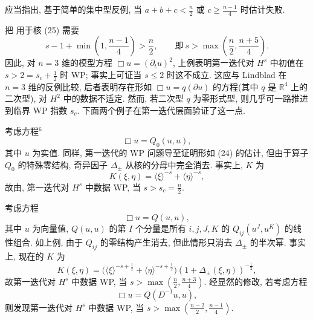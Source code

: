 \begin{remark}\label{rem:2.7}
应当指出, 基于简单的集中型反例, 当 $a + b + c < \frac{n}{2}$ 或 $c \geq \frac{n-1}{4}$ 时估计失败.\end{remark}

把 用于核 (25) 需要
\[
s-1+\min\left(1,\frac{n-1}{4}\right)>\frac{n}{2},\qquad \text{即}\ s>\max\left(\frac{n}{2},\frac{n+5}{4}\right).
\]
因此, 对 $n = 3$ 维的模型方程 $\Box u = (\partial_t u)^2$, 上例表明第一迭代对 $H^s$ 中初值在 $s > 2 = s_c + \frac{1}{2}$ 时 WP; 事实上可证当 $s \leq 2$ 时这不成立. 这应与 Lindblad \cite{klai49} 在 $n = 3$ 维的反例比较, 后者表明存在形如 $\Box u = q(\partial u)$ 的方程(其中 $q$ 是 $\mathbb{R}^4$ 上的二次型), 对 $H^2$ 中的数据不适定. 然而, 若二次型 $q$ 为零形式型, 则几乎可一路推进到临界 WP 指数 $s_c$. 下面两个例子在第一迭代层面验证了这一点.
\begin{example}\label{ex:2.2}
考虑方程$^{6}$
\begin{equation}
\Box u=Q_{0}(u,u),\end{equation}
其中 $u$ 为实值. 同样, 第一迭代的 WP 问题导至证明形如 (24) 的估计, 但由于算子 $Q_{0}$ 的特殊零结构, 奇异因子 $\Delta_{\pm}$ 从核的分母中完全消去. 事实上, $K$ 为
\[
K(\xi,\eta)=\langle\xi\rangle^{-s}+\langle\eta\rangle^{-s},
\]
故由, 第一迭代对 $H^{s}$ 中数据 WP, 当 $s > s_{c} = \frac{n}{2}$.\end{example}

\begin{example}\label{ex:2.3}
考虑方程
\begin{equation}
\Box u=Q(u,u),\end{equation}
其中 $u$ 为向量值, $Q(u,u)$ 的第 $I$ 个分量是所有 $i,j,J,K$ 的 $Q_{ij}(u^{J},u^{K})$ 的线性组合. 如上例, 由于 $Q_{ij}$ 的零结构产生消去, 但此情形只消去 $\Delta_{\pm}$ 的半次幂. 事实上, 现在的 $K$ 为
\[
K(\xi,\eta)=\bigl(\langle\xi\rangle^{-s+\frac{1}{2}}+\langle\eta\rangle^{-s+\frac{1}{2}}\bigr)\left(1+\Delta_{\pm}(\xi,\eta)\right)^{-\frac{1}{2}},
\]
故第一迭代对 $H^{s}$ 中数据 WP, 当 $s > \max\left(\frac{n}{2}, \frac{n+3}{4}\right)$.
经显然的修改, 若考虑方程
\[
\Box u=Q(D^{-1}u,u),
\]
则发现第一迭代对 $H^{s}$ 中数据 WP, 当 $s > \max\left(\frac{n-2}{2}, \frac{n-1}{4}\right)$.\end{example}

